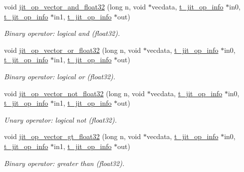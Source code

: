 \begin{DoxyCompactItemize}
void \hyperlink{group__opvecmod_ga22fa0793f8dfa1cc5165c160defea3db}{jit\_\-op\_\-vector\_\-and\_\-float32} (long n, void $\ast$vecdata, \hyperlink{structt__jit__op__info}{t\_\-jit\_\-op\_\-info} $\ast$in0, \hyperlink{structt__jit__op__info}{t\_\-jit\_\-op\_\-info} $\ast$in1, \hyperlink{structt__jit__op__info}{t\_\-jit\_\-op\_\-info} $\ast$out)
\begin{DoxyCompactList}\small\item\em Binary operator: logical and (float32). \item\end{DoxyCompactList}\item 
void \hyperlink{group__opvecmod_gaf1653680f6b5692db0b89d90871b54cc}{jit\_\-op\_\-vector\_\-or\_\-float32} (long n, void $\ast$vecdata, \hyperlink{structt__jit__op__info}{t\_\-jit\_\-op\_\-info} $\ast$in0, \hyperlink{structt__jit__op__info}{t\_\-jit\_\-op\_\-info} $\ast$in1, \hyperlink{structt__jit__op__info}{t\_\-jit\_\-op\_\-info} $\ast$out)
\begin{DoxyCompactList}\small\item\em Binary operator: logical or (float32). \item\end{DoxyCompactList}\item 
void \hyperlink{group__opvecmod_ga92ff286eb573295576e46b3155100e3c}{jit\_\-op\_\-vector\_\-not\_\-float32} (long n, void $\ast$vecdata, \hyperlink{structt__jit__op__info}{t\_\-jit\_\-op\_\-info} $\ast$in0, \hyperlink{structt__jit__op__info}{t\_\-jit\_\-op\_\-info} $\ast$in1, \hyperlink{structt__jit__op__info}{t\_\-jit\_\-op\_\-info} $\ast$out)
\begin{DoxyCompactList}\small\item\em Unary operator: logical not (float32). \item\end{DoxyCompactList}\item 
void \hyperlink{group__opvecmod_ga937a5b0d8e54b7f4fd596350821f3aaf}{jit\_\-op\_\-vector\_\-gt\_\-float32} (long n, void $\ast$vecdata, \hyperlink{structt__jit__op__info}{t\_\-jit\_\-op\_\-info} $\ast$in0, \hyperlink{structt__jit__op__info}{t\_\-jit\_\-op\_\-info} $\ast$in1, \hyperlink{structt__jit__op__info}{t\_\-jit\_\-op\_\-info} $\ast$out)
\begin{DoxyCompactList}\small\item\em Binary operator: greater than (float32). \item\end{DoxyCompactList}\item 

\end{DoxyCompactItemize}
